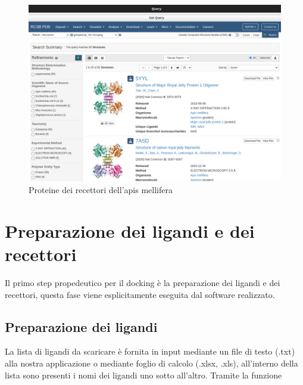 \begin{figure}[H]
    \centering
    \includegraphics[scale=0.4]{immagini/fileRecettori.png}
    \caption{Proteine dei recettori dell'apis mellifera}
    \label{fig:fileRecettori}
\end{figure}

\section{Preparazione dei ligandi e dei recettori}
\def\baselinestretch{1.66}
\noindent Il primo step propedeutico per il docking è la preparazione dei ligandi e dei recettori, questa
fase viene esplicitamente eseguita dal software realizzato.

\subsection{Preparazione dei ligandi}
\noindent La lista di ligandi da scaricare è fornita in input mediante un file di testo (.txt) alla nostra applicazione o mediante foglio di calcolo (.xlsx, .xls), all'interno della lista sono presenti i nomi dei ligandi uno sotto all'altro. Tramite la funzione